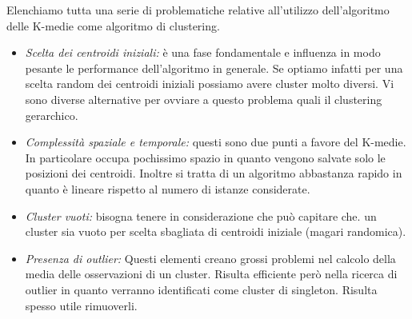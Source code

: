 Elenchiamo tutta una serie di problematiche relative all'utilizzo dell'algoritmo delle K-medie come algoritmo di clustering.
\begin{itemize}
	\item\textit{Scelta dei centroidi iniziali:} è una fase fondamentale e influenza in modo pesante le performance dell'algoritmo in generale. Se optiamo infatti per una scelta random dei centroidi iniziali possiamo avere cluster molto diversi. Vi sono diverse alternative per ovviare a questo problema quali il clustering gerarchico.
	\item \textit{Complessità spaziale e temporale:} questi sono due punti a favore del K-medie. In particolare occupa pochissimo spazio in quanto vengono salvate solo le posizioni dei centroidi. Inoltre si tratta di un algoritmo abbastanza rapido in quanto è lineare rispetto al numero di istanze considerate. 
	\item \textit{Cluster vuoti:} bisogna tenere in considerazione che può capitare che. un cluster sia vuoto per scelta sbagliata di centroidi iniziale (magari randomica).
	\item \textit{Presenza di outlier:} Questi elementi creano grossi problemi nel calcolo della media delle osservazioni di un cluster. Risulta efficiente però nella ricerca di outlier in quanto verranno identificati come cluster di singleton. Risulta spesso utile rimuoverli.
\end{itemize}

